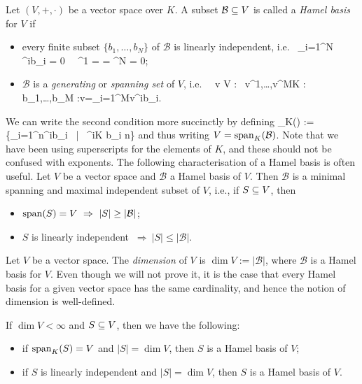 \bd
Let $(V,+,\cdot)$ be a vector space over $K$. A subset $\mathcal{B}\subseteq V$ is called a \emph{Hamel basis} for $V$ if 
\begin{itemize}
\item every finite subset $\{b_1,\ldots,b_N\}$ of $\mathcal{B}$ is linearly independent, i.e.\
\bse
\sum_{i=1}^N \lambda^ib_i = 0 \ \imp \ \lambda^1 = \cdots = \lambda^N = 0;
\ese
\item $\mathcal{B}$ is a \emph{generating} or \emph{spanning set} of $V$, i.e.\
\bse
\forall \, v \in V : \exists \, v^1,\ldots,v^M\in K : \exists \, b_1,\ldots,b_M \in {}:v=\ds \sum_{i=1}^Mv^ib_i.
\ese
\end{itemize}
\ed
\br
We can write the second condition more succinctly by defining
\bse
\lspan_K(\mathcal{B}) := \bigg\{\sum_{i=1}^n\lambda^ib_i \ \Big| \ \lambda^i\in K \land b_i\in {} \land n\bigg\}
\ese
and thus writing $V = \operatorname{span}_K(\mathcal{B})$.
\er
\br
Note that we have been using superscripts for the elements of $K$, and these should not be confused with exponents.
\er
The following characterisation of a Hamel basis is often useful.
\bp
Let $V$ be a vector space and $\mathcal{B}$ a Hamel basis of $V$. Then $\mathcal{B}$ is a minimal spanning and maximal independent subset of $V$, i.e., if $S\subseteq V$, then
\begin{itemize}
\item $\operatorname{span}(S) = V\ \Rightarrow \ |S| \geq |\mathcal{B}|$;
\item $S$ is linearly independent $\ \Rightarrow\ |S| \leq |\mathcal{B}|$. 
\end{itemize}
\ep

\bd
Let $V$ be a vector space. The \emph{dimension} of $V$ is $\dim V := |\mathcal{B}|$, where $\mathcal{B}$ is a Hamel basis for $V$.
\ed
Even though we will not prove it, it is the case that every Hamel basis for a given vector space has the same cardinality, and hence the notion of dimension is well-defined.

\bp
If $\dim V < \infty$ and $S\subseteq V$, then we have the following:
\begin{itemize}
\item if $\operatorname{span}_K(S) = V$ and $|S| = \dim V$, then $S$ is a Hamel basis of $V$;
\item if $S$ is linearly independent and $|S| = \dim V$, then $S$ is a Hamel basis of $V$. 
\end{itemize}
\ep

